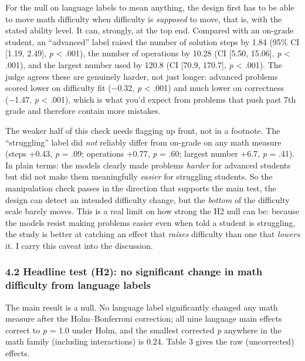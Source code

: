 \documentclass[
]{article}
\begin{document}
For the null on language labels to mean anything, the design first has
to be able to move math difficulty when difficulty is \emph{supposed} to
move, that is, with the stated ability level. It can, strongly, at the
top end. Compared with an on-grade student, an ``advanced'' label raised
the number of solution steps by 1.84 (95\% CI {[}1.19, 2.49{]}, \emph{p}
\textless{} .001), the number of operations by 10.28 (CI {[}5.50,
15.06{]}, \emph{p} \textless{} .001), and the largest number used by
120.8 (CI {[}70.9, 170.7{]}, \emph{p} \textless{} .001). The judge
agrees these are genuinely harder, not just longer: advanced problems
scored lower on difficulty fit (−0.32, \emph{p} \textless{} .001) and
much lower on correctness (−1.47, \emph{p} \textless{} .001), which is
what you'd expect from problems that push past 7th grade and therefore
contain more mistakes.

The weaker half of this check needs flagging up front, not in a
footnote. The ``struggling'' label did \emph{not} reliably differ from
on-grade on any math measure (steps +0.43, \emph{p} = .09; operations
+0.77, \emph{p} = .60; largest number +6.7, \emph{p} = .41). In plain
terms: the models clearly made problems \emph{harder} for advanced
students but did not make them meaningfully \emph{easier} for struggling
students. So the manipulation check passes in the direction that
supports the main test, the design can detect an intended difficulty
change, but the \emph{bottom} of the difficulty scale barely moves. This
is a real limit on how strong the H2 null can be: because the models
resist making problems easier even when told a student is struggling,
the study is better at catching an effect that \emph{raises} difficulty
than one that \emph{lowers} it. I carry this caveat into the discussion.

\hypertarget{headline-test-h2-no-significant-change-in-math-difficulty-from-language-labels}{%
\subsubsection{4.2 Headline test (H2): no significant change in math
difficulty from language
labels}\label{headline-test-h2-no-significant-change-in-math-difficulty-from-language-labels}}

The main result is a null. No language label significantly changed any
math measure after the Holm--Bonferroni correction; all nine language
main effects correct to \emph{p} = 1.0 under Holm, and the smallest
corrected \emph{p} anywhere in the math family (including interactions)
is 0.24. Table 3 gives the raw (uncorrected) effects.
\end{document}
